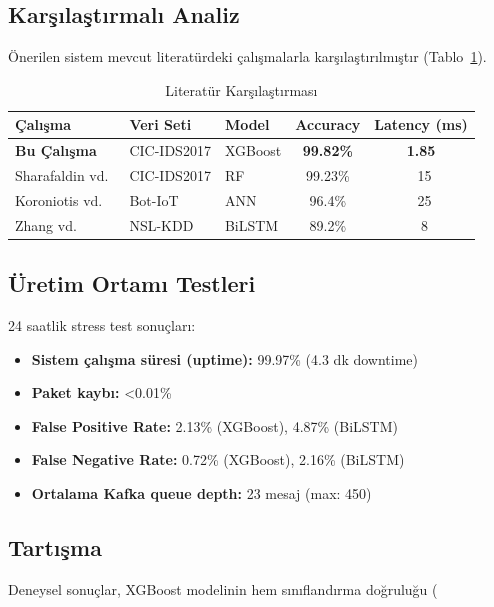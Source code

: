 \subsection{Karşılaştırmalı Analiz}

Önerilen sistem mevcut literatürdeki çalışmalarla karşılaştırılmıştır (Tablo~\ref{tab:literature}).

\begin{table}[h]
\centering
\caption{Literatür Karşılaştırması}
\label{tab:literature}
\begin{tabular}{lllcc}
\hline
\textbf{Çalışma} & \textbf{Veri Seti} & \textbf{Model} & \textbf{Accuracy} & \textbf{Latency (ms)} \\
\hline
\textbf{Bu Çalışma} & CIC-IDS2017 & XGBoost & \textbf{99.82\%} & \textbf{1.85} \\
Sharafaldin vd.~\cite{sharafaldin2018} & CIC-IDS2017 & RF & 99.23\% & ~15 \\
Koroniotis vd.~\cite{koroniotis2019} & Bot-IoT & ANN & 96.4\% & ~25 \\
Zhang vd.~\cite{zhang2020} & NSL-KDD & BiLSTM & 89.2\% & ~8 \\
\hline
\end{tabular}
\end{table}

\subsection{Üretim Ortamı Testleri}

24 saatlik stress test sonuçları:
\begin{itemize}
    \item \textbf{Sistem çalışma süresi (uptime):} 99.97\% (4.3 dk downtime)
    \item \textbf{Paket kaybı:} <0.01\%
    \item \textbf{False Positive Rate:} 2.13\% (XGBoost), 4.87\% (BiLSTM)
    \item \textbf{False Negative Rate:} 0.72\% (XGBoost), 2.16\% (BiLSTM)
    \item \textbf{Ortalama Kafka queue depth:} 23 mesaj (max: 450)
\end{itemize}

\subsection{Tartışma}

Deneysel sonuçlar, XGBoost modelinin hem sınıflandırma doğruluğu (%

